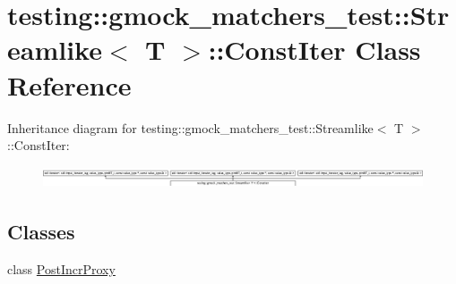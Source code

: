 \hypertarget{classtesting_1_1gmock__matchers__test_1_1_streamlike_1_1_const_iter}{}\section{testing\+::gmock\+\_\+matchers\+\_\+test\+::Streamlike$<$ T $>$\+::Const\+Iter Class Reference}
\label{classtesting_1_1gmock__matchers__test_1_1_streamlike_1_1_const_iter}
Inheritance diagram for testing\+::gmock\+\_\+matchers\+\_\+test\+::Streamlike$<$ T $>$\+::Const\+Iter\+:\begin{figure}[H]
\begin{center}
\leavevmode
\includegraphics[height=0.636002cm]{d2/dbb/classtesting_1_1gmock__matchers__test_1_1_streamlike_1_1_const_iter}
\end{center}
\end{figure}
\subsection*{Classes}
\begin{DoxyCompactItemize}
\item 
class \mbox{\hyperlink{classtesting_1_1gmock__matchers__test_1_1_streamlike_1_1_const_iter_1_1_post_incr_proxy}{Post\+Incr\+Proxy}}
\end{DoxyCompactItemize}

